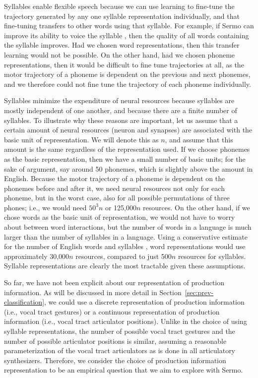 Syllables enable flexible speech
because we can use learning to
fine-tune the trajectory generated by any
one syllable representation individually,
and that fine-tuning transfers
to other words using that syllable.
For example,
if Sermo can improve its ability
to voice the syllable \ipa{[bA]},
then the quality of all words
containing the syllable \ipa{[bA]}
improves.
Had we chosen word representations,
then this transfer learning
would not be possible.
On the other hand,
had we chosen phoneme representations,
then it would be difficult
to fine tune trajectories at all,
as the motor trajectory of a phoneme
is dependent on the
previous and next phonemes,
and we therefore could not fine tune
the trajectory of each phoneme individually.

Syllables minimize the expenditure of neural resources
because syllables are mostly independent of one another,
and because there are a finite number of syllables.
To illustrate why these reasons are important,
let us assume that a certain amount of
neural resources (neuron and synapses)
are associated with the basic unit of representation.
We will denote this as $n$,
and assume that this amount is the same
regardless of the representation used.
If we choose phonemes as the basic representation,
then we have a small number of basic units;
for the sake of argument,
say around 50 phonemes,
which is slightly above the amount
in English.
Because the motor trajectory
of a phoneme is dependent on the
phonemes before and after it,
we need neural resources not only for
each phoneme, but in the worst case,
also for all possible
permutations of three phones;
i.e., we would need $50^3n$ or 125,000$n$ resources.
On the other hand, if we chose
words as the basic unit of representation,
we would not have to worry about
between word interactions,
but the number of words in a language
is much larger than the number of syllables
in a language.
Using a conservative estimate
for the number of English words
and syllables
\citep{schiller1996},
word representations would use approximately
30,000$n$ resources,
compared to just 500$n$ resources for syllables.
Syllable representations are clearly the most tractable
given these assumptions.

So far, we have not been explicit
about our representation of production information.
As will be discussed in more detail
in Section~\ref{sec:prev-classification},
we could use a discrete representation
of production information
(i.e., vocal tract gestures)
or a continuous representation
of production information
(i.e., vocal tract articulator positions).
Unlike in the choice of
using syllable representations,
the number of possible vocal tract gestures
and the number of possible articulator positions
is similar,
assuming a reasonable parameterization
of the vocal tract articulators
as is done in all articulatory synthesizers.
Therefore, we consider the choice
of production information representation
to be an empirical question
that we aim to explore with Sermo.

